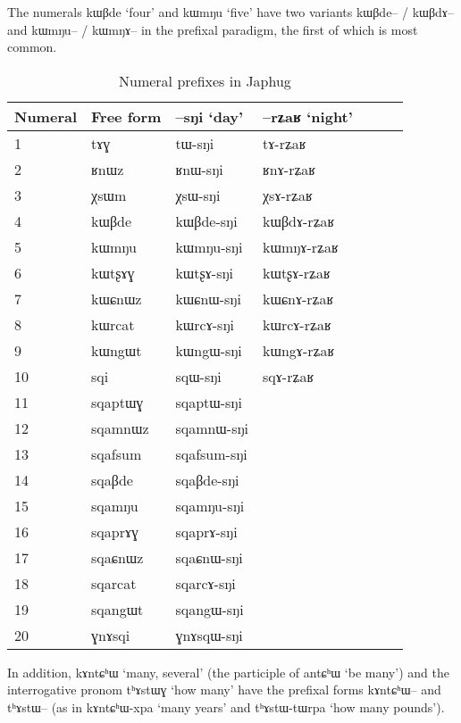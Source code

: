 \documentclass[oldfontcommands,oneside,a4paper,12pt]{article}
\newcommand{\ipa}[1]{{\phon#1}}
\begin{document}
The numerals 	\ipa{kɯβde}  `four'   and \ipa{kɯmŋu} `five' have two variants \ipa{ kɯβde-- / kɯβdɤ--} and \ipa{ kɯmŋu-- / kɯmŋɤ--} in the prefixal paradigm, the first of which is most common.
 
 \begin{table}[H]
\caption{Numeral prefixes in Japhug}  \label{tab:num.prefix} \centering
\begin{tabular}{lllllll}
\toprule
Numeral & Free form &  \ipa{--sŋi} `day' &  \ipa{--rʑaʁ} `night' \\
\midrule
 1	&	\ipa{tɤɣ}  &	\ipa{tɯ-sŋi}  &	\ipa{tɤ-rʑaʁ}  &	\\
2	&	\ipa{ʁnɯz}  &	\ipa{ʁnɯ-sŋi}  &	\ipa{ʁnɤ-rʑaʁ}  &	\\
3	&	\ipa{χsɯm}  &	\ipa{χsɯ-sŋi}  &	\ipa{χsɤ-rʑaʁ}  &	\\
4	&	\ipa{kɯβde}  &	\ipa{kɯβde-sŋi}  &	\ipa{kɯβdɤ-rʑaʁ}  &	\\
5	&	\ipa{kɯmŋu}  &	\ipa{kɯmŋu-sŋi}  &	\ipa{kɯmŋɤ-rʑaʁ}  &	\\
6	&	\ipa{kɯtʂɤɣ}  &	\ipa{kɯtʂɤ-sŋi}  &	\ipa{kɯtʂɤ-rʑaʁ}  &	\\
7	&	\ipa{kɯɕnɯz}  &	\ipa{kɯɕnɯ-sŋi}  &	\ipa{kɯɕnɤ-rʑaʁ}  &	\\
8	&	\ipa{kɯrcat}  &	\ipa{kɯrcɤ-sŋi}  &	\ipa{kɯrcɤ-rʑaʁ}  &	\\
9	&	\ipa{kɯngɯt}  &	\ipa{kɯngɯ-sŋi}  &	\ipa{kɯngɤ-rʑaʁ}  &	\\
10	&	\ipa{sqi}  &	\ipa{sqɯ-sŋi}  &\ipa{sqɤ-rʑaʁ}  &	\\
\midrule
11	&	\ipa{sqaptɯɣ}  &	\ipa{sqaptɯ-sŋi}  &	\\
12	&	\ipa{sqamnɯz}  &	\ipa{sqamnɯ-sŋi}  &	\\
13	&	\ipa{sqafsum}  &	\ipa{sqafsum-sŋi}  &	\\
14	&	\ipa{sqaβde}  &	\ipa{sqaβde-sŋi}  &	\\
15	&	\ipa{sqamŋu}  &	\ipa{sqamŋu-sŋi}  &	\\
16	&	\ipa{sqaprɤɣ}  &	\ipa{sqaprɤ-sŋi}  &	\\
17	&	\ipa{sqaɕnɯz}  &	\ipa{sqaɕnɯ-sŋi}  &	\\
18	&	\ipa{sqarcat}  &	\ipa{sqarcɤ-sŋi}  &	\\
19	&	\ipa{sqangɯt}  &	\ipa{sqangɯ-sŋi}  &	\\
20	&	\ipa{ɣnɤsqi}  &	\ipa{ɣnɤsqɯ-sŋi}  &	\\
\bottomrule
\end{tabular}
\end{table}
In addition,  \ipa{kɤntɕʰɯ} `many, several' (the participle of \ipa{antɕʰɯ} `be many') and the interrogative pronom \ipa{tʰɤstɯɣ} `how many' have the prefixal forms \ipa{kɤntɕʰɯ--} and \ipa{tʰɤstɯ--} (as in \ipa{kɤntɕʰɯ-xpa} `many years' and \ipa{tʰɤstɯ-tɯrpa} `how many pounds').
\end{document}
